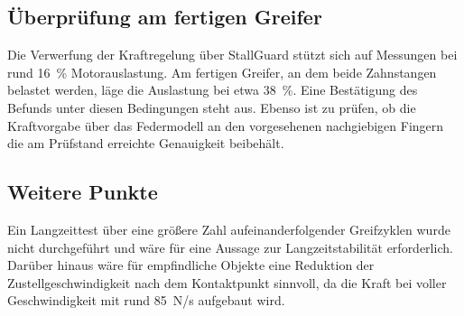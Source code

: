 \subsection*{Überprüfung am fertigen Greifer}

Die Verwerfung der Kraftregelung über StallGuard stützt sich auf Messungen bei rund 16~\%
Motorauslastung. Am fertigen Greifer, an dem beide Zahnstangen belastet werden, läge die
Auslastung bei etwa 38~\%. Eine Bestätigung des Befunds unter diesen Bedingungen steht aus.
Ebenso ist zu prüfen, ob die Kraftvorgabe über das Federmodell an den vorgesehenen
nachgiebigen Fingern die am Prüfstand erreichte Genauigkeit beibehält.

\subsection*{Weitere Punkte}

Ein Langzeittest über eine größere Zahl aufeinanderfolgender Greifzyklen wurde nicht
durchgeführt und wäre für eine Aussage zur Langzeitstabilität erforderlich. Darüber hinaus
wäre für empfindliche Objekte eine Reduktion der Zustellgeschwindigkeit nach dem
Kontaktpunkt sinnvoll, da die Kraft bei voller Geschwindigkeit mit rund 85~N/s aufgebaut
wird.